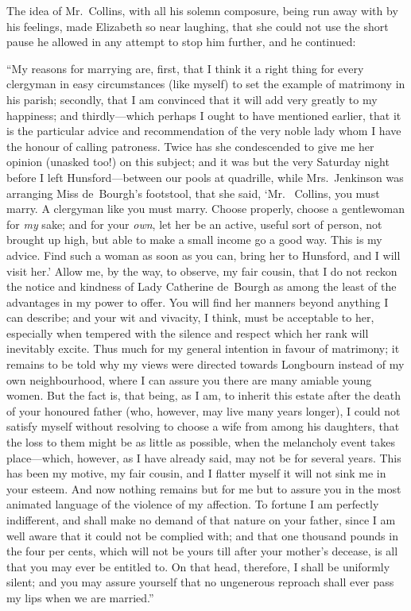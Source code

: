 The idea of Mr.\ Collins, with all his solemn composure, being
run away with by his feelings, made Elizabeth so near laughing,
that she could not use the short pause he allowed in any attempt
to stop him further, and he continued:

``My reasons for marrying are, first, that I think it a right
thing for every clergyman in easy circumstances (like myself) to
set the example of matrimony in his parish; secondly, that I am
convinced that it will add very greatly to my happiness; and
thirdly---which perhaps I ought to have mentioned earlier, that
it is the particular advice and recommendation of the very noble
lady whom I have the honour of calling patroness.  Twice has
she condescended to give me her opinion (unasked too!) on this
subject; and it was but the very Saturday night before I left
Hunsford---between our pools at quadrille, while Mrs.\ Jenkinson
was arranging Miss de~Bourgh's footstool, that she said, `Mr.\ %
Collins, you must marry.  A clergyman like you must marry.
Choose properly, choose a gentlewoman for \emph{my} sake; and for
your \emph{own}, let her be an active, useful sort of person, not brought
up high, but able to make a small income go a good way.  This is
my advice.  Find such a woman as soon as you can, bring her to
Hunsford, and I will visit her.'  Allow me, by the way, to
observe, my fair cousin, that I do not reckon the notice and
kindness of Lady Catherine de~Bourgh as among the least of the
advantages in my power to offer.  You will find her manners
beyond anything I can describe; and your wit and vivacity, I
think, must be acceptable to her, especially when tempered with
the silence and respect which her rank will inevitably excite.
Thus much for my general intention in favour of matrimony;
it remains to be told why my views were directed towards
Longbourn instead of my own neighbourhood, where I can
assure you there are many amiable young women.  But the fact
is, that being, as I am, to inherit this estate after the death of
your honoured father (who, however, may live many years
longer), I could not satisfy myself without resolving to choose a
wife from among his daughters, that the loss to them might be as
little as possible, when the melancholy event takes place---which,
however, as I have already said, may not be for several years.
This has been my motive, my fair cousin, and I flatter myself it
will not sink me in your esteem.  And now nothing remains but
for me but to assure you in the most animated language of the
violence of my affection.  To fortune I am perfectly indifferent,
and shall make no demand of that nature on your father, since I
am well aware that it could not be complied with; and that one
thousand pounds in the four per cents, which will not be yours
till after your mother's decease, is all that you may ever be
entitled to.  On that head, therefore, I shall be uniformly silent;
and you may assure yourself that no ungenerous reproach shall
ever pass my lips when we are married.''

